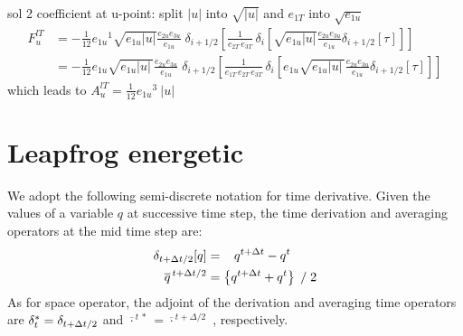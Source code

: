 \documentclass[../tex_main/NEMO_manual]{subfiles}
\begin{document}
sol 2 coefficient at u-point: split $|u|$ into $\sqrt{|u|}$ and $e_{1T}$ into $\sqrt{e_{1u}}$
\begin{equation} \label{eq:tra_adv_ubs2}
\begin{split}
F_u^{lT}
&= - \frac{1}{12} {e_{1u}}^1 \sqrt{e_{1u}|u|} \frac{e_{2u} e_{3u}}{e_{1u}}\;\delta_{i+1/2}\left[ \frac{1}{e_{2T}\,e_{3T}}\,\delta _i \left[ \sqrt{e_{1u}|u|} \frac{e_{2u} e_{3u} }{e_{1u} } \delta _{i+1/2}[\tau] \right] \right] \\
&= - \frac{1}{12} e_{1u} \sqrt{e_{1u}|u|\,} \frac{e_{2u} e_{3u}}{e_{1u}}\;\delta_{i+1/2}\left[ \frac{1}{e_{1T}\,e_{2T}\,e_{3T}}\,\delta _i \left[ e_{1u} \sqrt{e_{1u}|u|\,} \frac{e_{2u} e_{3u} }{e_{1u}} \delta _{i+1/2}[\tau] \right] \right]
\end{split}
\end{equation}
which leads to ${A_u^{lT}} = \frac{1}{12} {e_{1u}}^3\ |u|$


\section{Leapfrog energetic}
\label{sec:LF}

We adopt the following semi-discrete notation for time derivative. Given the values of a variable $q$ at successive time step, the time derivation and averaging operators at the mid time step are:
\begin{subequations} \label{eq:dt_mt}
\begin{align}
 \delta _{t+\Delta t/2} [q]     &=  \  \ \,   q^{t+\Delta t}  - q^{t}		\\
 \overline q^{\,t+\Delta t/2} &= \left\{ q^{t+\Delta t} + q^{t} \right\} \; / \; 2
\end{align}
\end{subequations}
As for space operator, the adjoint of the derivation and averaging time operators are 
$\delta_t^*=\delta_{t+\Delta t/2}$ and $\overline{\cdot}^{\,t\,*}= \overline{\cdot}^{\,t+\Delta/2}$
, respectively. 
\end{document}
